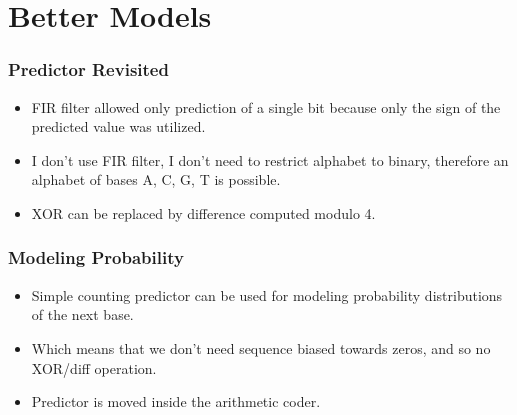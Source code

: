 \documentclass[hyperref={colorlinks=true}]{beamer}
\begin{document}
\section{Better Models}

\begin{frame}
\frametitle{Predictor Revisited}

\begin{itemize}
	\item FIR filter allowed only prediction of a single bit because only the sign of the predicted value was utilized.
	\item I don't use FIR filter, I don't need to restrict alphabet to binary, therefore an alphabet of bases A, C, G, T is possible.
	\item XOR can be replaced by difference computed modulo 4.
\end{itemize}

\end{frame}

\begin{frame}
\frametitle{Modeling Probability}

\begin{itemize}
	\item Simple counting predictor can be used for modeling probability distributions of the next base.
	\item Which means that we don't need sequence biased towards zeros, and so no XOR/diff operation.
	\item Predictor is moved inside the arithmetic coder.
\end{itemize}

\end{frame}
\end{document}
